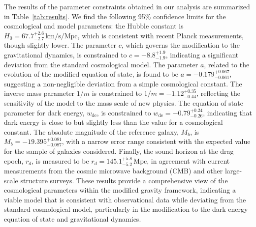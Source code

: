 \documentclass[preprint]{aastex631}
\begin{document}
The results of the parameter constraints obtained in our analysis are summarized in Table~\ref{tab:results}. We find the following 95\% confidence limits for the cosmological and model parameters: the Hubble constant is \( H_0 = 67.7^{+2.6}_{-2.7} \, \text{km/s/Mpc} \), which is consistent with recent Planck measurements, though slightly lower. The parameter \( c \), which governs the modification to the gravitational dynamics, is constrained to \( c = -8.8^{+1.9}_{-1.9} \), indicating a significant deviation from the standard cosmological model. The parameter \( a \), related to the evolution of the modified equation of state, is found to be \( a = -0.179^{+0.067}_{-0.061} \), suggesting a non-negligible deviation from a simple cosmological constant. The inverse mass parameter \( 1/m \) is constrained to \( 1/m = -1.12^{+0.35}_{-0.44} \), reflecting the sensitivity of the model to the mass scale of new physics. The equation of state parameter for dark energy, \( w_{\text{de}} \), is constrained to \( w_{\text{de}} = -0.79^{+0.24}_{-0.26} \), indicating that dark energy is close to but slightly less than the value for a cosmological constant. The absolute magnitude of the reference galaxy, \( M_b \), is \( M_b = -19.395^{+0.081}_{-0.087} \), with a narrow error range consistent with the expected value for the sample of galaxies considered. Finally, the sound horizon at the drag epoch, \( r_d \), is measured to be \( r_d = 145.1^{+5.8}_{-5.2} \, \text{Mpc} \), in agreement with current measurements from the cosmic microwave background (CMB) and other large-scale structure surveys. These results provide a comprehensive view of the cosmological parameters within the modified gravity framework, indicating a viable model that is consistent with observational data while deviating from the standard cosmological model, particularly in the modification to the dark energy equation of state and gravitational dynamics.
\end{document}
